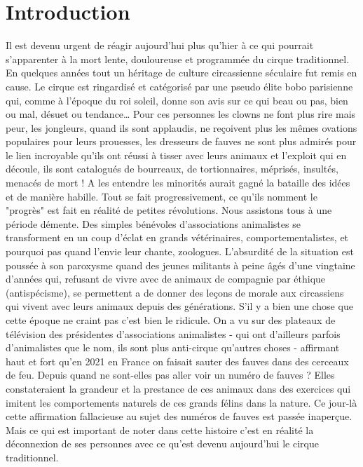 \chapter*{Introduction}
\noindent
Il est devenu urgent de réagir aujourd’hui plus qu’hier à ce qui pourrait s’apparenter à la mort lente, douloureuse et programmée du cirque traditionnel. En quelques années tout un héritage de culture circassienne séculaire fut remis en cause. Le cirque est ringardisé et catégorisé par une pseudo élite bobo parisienne qui, comme à l’époque du roi soleil, donne son avis sur ce qui beau ou pas, bien ou mal, désuet ou tendance… Pour ces personnes les clowns ne font plus rire mais peur, les jongleurs, quand ils sont applaudis, ne reçoivent plus les mêmes ovations populaires pour leurs prouesses, les dresseurs de fauves ne sont plus admirés pour le lien incroyable qu’ils ont réussi à tisser avec leurs animaux et l’exploit qui en découle, ils sont catalogués de bourreaux, de tortionnaires, méprisés, insultés, menacés de mort ! A les entendre les minorités aurait gagné la bataille des idées et de manière habille. Tout se fait progressivement, ce qu’ils nomment le "progrès" est fait en réalité de petites révolutions. Nous assistons tous à une période démente. Des simples bénévoles d’associations animalistes se transforment en un coup d’éclat en grands vétérinaires, comportementalistes, et pourquoi pas quand l’envie leur chante, zoologues. L’absurdité de la situation est poussée à son paroxysme quand des jeunes militants à peine âgés d’une vingtaine d’années qui, refusant de vivre avec de animaux de compagnie par éthique (antispécisme), se permettent a de donner des leçons de morale aux circassiens qui vivent avec leurs animaux depuis des générations. S’il y a bien une chose que cette époque ne craint pas c’est bien le ridicule. On a vu sur des plateaux de télévision des présidentes d’associations animalistes - qui ont d’ailleurs parfois d’animalistes que le nom, ils sont plus anti-cirque qu’autres choses - affirmant haut et fort qu’en 2021 en France on faisait sauter des fauves dans des cerceaux de feu. Depuis quand ne sont-elles pas aller voir un numéro de fauves ? Elles constateraient la grandeur et la prestance de ces animaux dans des exercices qui imitent les comportements naturels de ces grands félins dans la nature. Ce jour-là cette affirmation fallacieuse au sujet des numéros de fauves est passée inaperçue. Mais ce qui est important de noter dans cette histoire c’est en réalité la déconnexion de ses personnes avec ce qu’est devenu aujourd’hui le cirque traditionnel.
